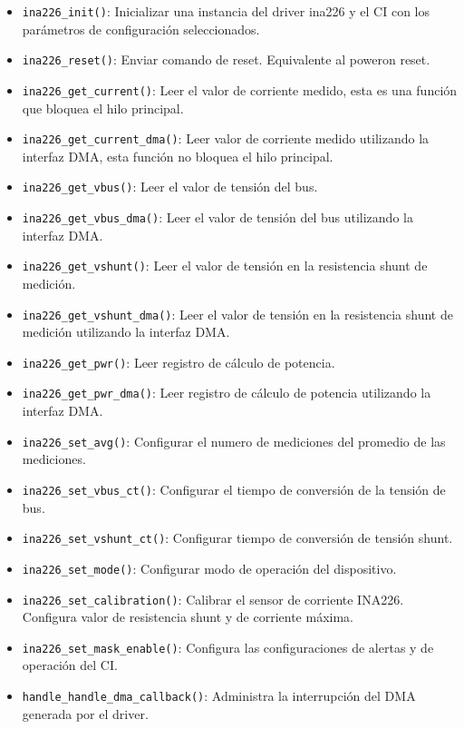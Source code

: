 \documentclass[10pt, a4paper]{report}
\begin{document}
\begin{itemize}
    \item \texttt{ina226\_init()}: Inicializar una instancia del driver ina226 y
        el \acrshort{CI} con los parámetros de configuración seleccionados.
    \item \texttt{ina226\_reset()}: Enviar comando de reset. Equivalente al
        power\textendash on reset.
    \item \texttt{ina226\_get\_current()}: Leer el valor de corriente medido,
        esta es una funci\'on que bloquea el hilo principal.
    \item \texttt{ina226\_get\_current\_dma()}: Leer valor de corriente medido
        utilizando la interfaz \acrshort{DMA}, esta funci\'on no bloquea el hilo
        principal.
    \item \texttt{ina226\_get\_vbus()}: Leer el valor de tensión del bus.
    \item \texttt{ina226\_get\_vbus\_dma()}: Leer el valor de tensión del bus
        utilizando la interfaz \acrshort{DMA}.
    \item \texttt{ina226\_get\_vshunt()}: Leer el valor de tensión en la
        resistencia shunt de medición.
    \item \texttt{ina226\_get\_vshunt\_dma()}: Leer el valor de tensión en la
        resistencia shunt de medición utilizando la interfaz \acrshort{DMA}.
    \item \texttt{ina226\_get\_pwr()}: Leer registro de cálculo de potencia.
    \item \texttt{ina226\_get\_pwr\_dma()}: Leer registro de cálculo de potencia
        utilizando la interfaz \acrshort{DMA}.
    \item \texttt{ina226\_set\_avg()}: Configurar el numero de mediciones del
        promedio de las mediciones.
    \item \texttt{ina226\_set\_vbus\_ct()}: Configurar el tiempo de conversión de
        la tensión de bus.
    \item \texttt{ina226\_set\_vshunt\_ct()}: Configurar tiempo de conversión de
        tensión shunt.
    \item \texttt{ina226\_set\_mode()}: Configurar modo de operación del
        dispositivo.
    \item \texttt{ina226\_set\_calibration()}: Calibrar el sensor de corriente
        INA226. Configura valor de resistencia shunt y de corriente máxima.
    \item \texttt{ina226\_set\_mask\_enable()}: Configura las configuraciones de
        alertas y de operación del \acrshort{CI}.
    \item \texttt{handle\_handle\_dma\_callback()}: Administra la interrupción 
        del \acrshort{DMA} generada por el driver.
\end{itemize}
\end{document}
